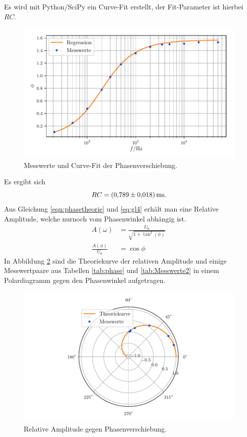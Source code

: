 Es wird mit Python/SciPy ein Curve-Fit erstellt, der Fit-Parameter ist hierbei $RC$.
\begin{figure}[H]
    \centering
    \includegraphics[width=\textwidth]{build/messung3.pdf}
    \caption{Messwerte und Curve-Fit der Phasenverschiebung.}
    \label{fig:plot3}
\end{figure}
\noindent
Es ergibt sich
\begin{equation}
    RC = \SI{0.789\pm0.018}{\milli\second}.
\end{equation}
\noindent
Aus Gleichung \eqref{eqn:phasetheorie} und \eqref{eq:gl4} erhält man eine Relative Amplitude, welche nurnoch vom Phasenwinkel abhängig ist.
\begin{align}
	A(\omega) & = \frac{U_0}{\sqrt{1+\tan^2(\phi)}} \\
	\frac{A(\phi)}{U_0} & = \cos{\phi}
\end{align}
In Abbildung \ref{fig:polar} sind die Theoriekurve der relativen Amplitude und einige Messwertpaare aus Tabellen \ref{tab:phase} und \ref{tab:Messwerte2} in einem Polardiagramm gegen den Phasenwinkel aufgetragen.
\begin{figure}[H]
    \centering
    \includegraphics[width=\textwidth]{build/polar.pdf}
    \caption{Relative Amplitude gegen Phasenverschiebung.}
    \label{fig:polar}
\end{figure}
%

